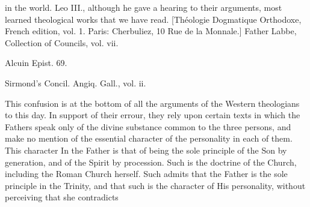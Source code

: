 in the world. Leo III., although he gave a hearing to their arguments, most learned theological works that we have read. [Théologie Dogmatique Orthodoxe, French edition, vol. 1. Paris: Cherbuliez, 10 Rue de la Monnale.] Father Labbe, Collection of Councils, vol. vii.

Alcuin Epist. 69.

Sirmond’s Concil. Angiq. Gall., vol. ii.

This confusion is at the bottom of all the arguments of the Western theologians to this day. In support of their errour, they rely upon certain texts in which the Fathers speak only of the divine substance common to the three persons, and make no mention of the essential character of the personality in each of them. This character In the Father is that of being the sole principle of the Son by generation, and of the Spirit by procession. Such is the doctrine of the Church, including the Roman Church herself. Such admits that the Father is the sole principle in the Trinity, and that such is the character of His personality, without perceiving that she contradicts

